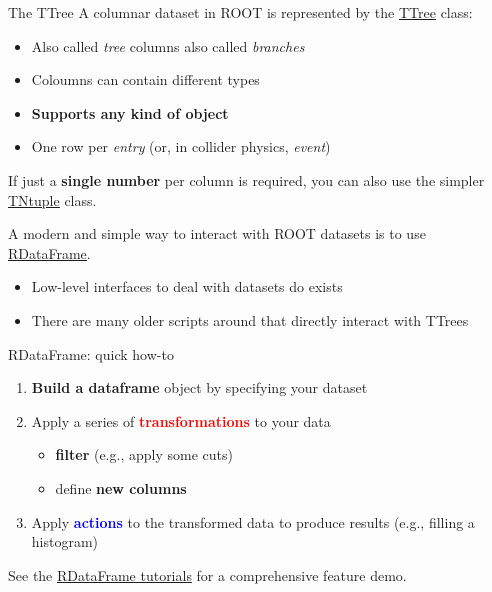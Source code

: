 \documentclass[aspectratio=169]{beamer}
\newcommand{\myhref}[2]{{\color{blue}\href{#1}{\underline{#2}}}}
\begin{document}
\begin{frame}{The TTree}
    A columnar dataset in ROOT is represented by the \myhref{https://root.cern.ch/doc/master/classTTree.html}{TTree} class:
    \vspace{3mm}
    \begin{itemize}
        \item Also called \textit{tree} columns also called \textit{branches}
        \item Coloumns can contain different types
        \item \textbf{Supports any kind of object}
        \item One row per \textit{entry} (or, in collider physics, \textit{event})
    \end{itemize}
    \vspace{3mm}
    If just a \textbf{single number} per column is required, you can also use the simpler \myhref{https://root.cern.ch/doc/master/classTNtuple.html}{TNtuple} class.

    \vspace{3mm}

    {\color{darkgreen} A modern and simple way to interact with ROOT datasets is to use \myhref{https://root.cern/doc/master/classROOT_1_1RDataFrame.html}{RDataFrame}}.
    \vspace{3mm}
    \begin{itemize}
        \item Low-level interfaces to deal with datasets do exists
        \item There are many older scripts around that directly interact with TTrees
    \end{itemize}
\end{frame}

\begin{frame}[fragile]{RDataFrame: quick how-to}
    \begin{enumerate}
        \item \textbf{Build a dataframe} object by specifying your dataset
        \item Apply a series of \textcolor{red}{\textbf{transformations}} to your data
        \begin{itemize}
            \item \textbf{filter} (e.g., apply some cuts)
            \item define \textbf{new columns}
        \end{itemize}
    \item Apply \textcolor{blue}{\textbf{actions}} to the transformed data to produce results (e.g., filling a histogram)
    \end{enumerate}
\vspace{0.5cm}
See the \href{https://root.cern.ch/doc/master/group__tutorial__dataframe.html}{RDataFrame tutorials} for a comprehensive feature demo.
\end{frame}
\end{document}
